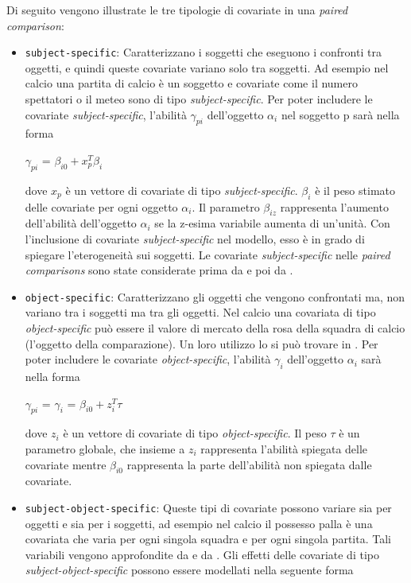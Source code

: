 Di seguito vengono illustrate le tre tipologie di covariate in una \emph{paired comparison}:
\begin{itemize}
	\item \texttt{subject-specific}: Caratterizzano i soggetti che eseguono i confronti tra oggetti, e quindi queste covariate variano solo tra soggetti. Ad esempio nel calcio una partita di calcio è un soggetto e covariate come il numero spettatori o il meteo sono di tipo \emph{subject-specific}. Per poter includere le covariate \emph{subject-specific}, l'abilità $\gamma_{pi}$ dell'oggetto $\alpha_{i}$ nel soggetto p sarà nella forma 
	\begin{center}
		$ \gamma_{pi}$ = $\beta_{i0} + x^{T}_{p}\beta_i$
	\end{center}
	dove $x_p$ è un vettore di covariate di tipo \emph{subject-specific}. $\beta_i$ è il peso stimato delle covariate per ogni oggetto $\alpha_{i}$. Il parametro $\beta_{iz}$ rappresenta l'aumento dell'abilità dell'oggetto $\alpha_{i}$ se la z-esima variabile aumenta di un'unità. Con l'inclusione di covariate \emph{subject-specific} nel modello, esso è in grado di spiegare l'eterogeneità sui soggetti. Le covariate \emph{subject-specific} nelle \emph{paired comparisons} sono state considerate prima da \autocite{Turner2012Firth} e poi da \autocite{Francis2010}.
	\item \texttt{object-specific}: Caratterizzano gli oggetti che vengono confrontati ma, non variano tra i soggetti ma tra gli oggetti. Nel calcio una covariata di tipo \emph{object-specific} può essere il valore di mercato della rosa della squadra di calcio (l'oggetto della comparazione). Un loro utilizzo lo si può trovare in \autocite{TutzSchauberger2015}.
	Per poter includere le covariate \emph{object-specific}, l'abilità $\gamma_{i}$ dell'oggetto $\alpha_{i}$ sarà nella forma 
	\begin{center}
		$\gamma_{pi}$ = $ \gamma_{i}$ = $\beta_{i0} + z^{T}_{i}\tau$
	\end{center}
	dove $z_{i}$ è un vettore di covariate di tipo \emph{object-specific}. Il peso $\tau$ è un parametro globale, che insieme a $z_{i}$ rappresenta l'abilità spiegata delle covariate mentre $\beta_{i0}$ rappresenta la parte dell'abilità non spiegata dalle covariate. 
	\item \texttt{subject-object-specific}: Queste tipi di covariate possono variare sia per oggetti e sia per i soggetti, ad esempio nel calcio il possesso palla è una covariata che varia per ogni singola squadra e per ogni singola partita. Tali variabili vengono approfondite da \autocite{ThunerEymann2000} e da \autocite{MauererPossneckerThurnerTutz2015}. Gli effetti delle covariate di tipo \emph{subject-object-specific} possono essere modellati nella seguente forma

\end{itemize}
